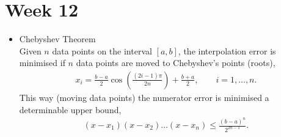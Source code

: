\documentclass[11pt,a4paper]{report}
\begin{document}
		\section{Week 12}
		\begin{itemize}
			\item Chebyshev Theorem \\
				Given $n$ data points on the interval $\left[ a,b\right]$, the interpolation error is minimised if $n$ data points are moved to Chebyshev's points (roots),
				\begin{align}
					x_i = \frac{b-a}{2} \cos \left(\frac{(2i-1)\pi}{2n} \right) + \frac{b+a}{2}, \quad \quad i=1,\dots,n.
				\end{align}
				This way (moving data points) the numerator error is minimised a determinable upper bound,
				\begin{align}
					(x-x_1)(x-x_2)\dots(x-x_n) \leq \frac{(b-a)^n}{2^{2n-1}}.
				\end{align}
		\end{itemize}
\end{document}
